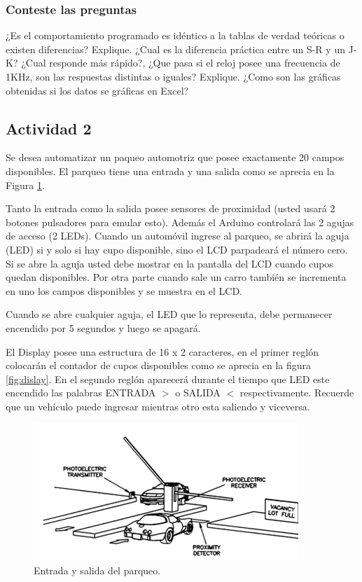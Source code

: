 \subsubsection{Conteste las preguntas}

¿Es el comportamiento programado es idéntico a la tablas de verdad teóricas o existen diferencias? Explique.
¿Cual es la diferencia práctica entre un S-R y un J-K? ¿Cual responde más rápido?,
¿Que pasa si el reloj posee una frecuencia de 1KHz, son las respuestas distintas o iguales? Explique. 
¿Como son las gráficas obtenidas si los datos se gráficas en Excel?

\subsection{Actividad 2}

Se desea automatizar un paqueo automotriz que posee exactamente 20 campos disponibles. El parqueo tiene una entrada y una salida como se aprecia en la Figura \ref{fig:parqueo}. 

Tanto la entrada como la salida posee sensores de proximidad (usted usará 2 botones pulsadores para emular  esto). Además el Arduino controlará las 2 agujas de acceso (2 LEDs). Cuando un automóvil ingrese al parqueo, se abrirá la aguja (LED) si y solo si hay cupo disponible, sino el LCD parpadeará el número cero. Si se abre la aguja usted debe mostrar en la pantalla del LCD cuando cupos quedan disponibles. Por otra parte cuando sale un carro también se incrementa en uno los campos disponibles y se muestra en el LCD.

Cuando se abre cualquier aguja, el LED que lo representa, debe permanecer encendido por 5 segundos y luego se apagará.

El Display posee una estructura de 16 x 2 caracteres, en el primer reglón colocarán el contador de cupos disponibles como se aprecia en la figura \ref{fig:dislay}. En el segundo reglón aparecerá durante el tiempo que LED  este encendido las palabras ENTRADA $>$ o SALIDA $<$  respectivamente. Recuerde que un vehículo puede ingresar mientras otro esta saliendo y viceversa.

\begin{figure}
	\centering
	\includegraphics[width=0.7\linewidth]{fig/Parqueo.png}
	\caption{Entrada y salida del parqueo.}
	\label{fig:parqueo}
\end{figure}

